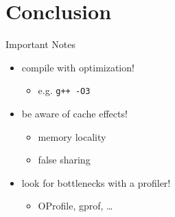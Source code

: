 \documentclass{beamer}
\newcommand{\code}{\texttt}
\begin{document}
\section{Conclusion}

\begin{frame}{Important Notes}

\begin{itemize}
\item compile with optimization!
\begin{itemize}
\item e.g. \code{g++ -O3}
\end{itemize}
\end{itemize}
\pause

\begin{itemize}
\item be aware of cache effects!
\begin{itemize}
\item memory locality
\item false sharing
\end{itemize}
\item look for bottlenecks with a profiler!
\begin{itemize}
\item OProfile, gprof, \dots
\end{itemize}
\end{itemize}

\end{frame}
\end{document}
